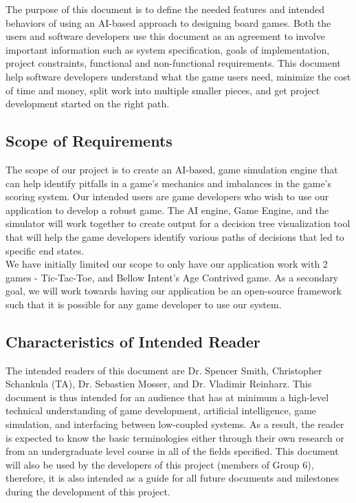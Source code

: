 \documentclass[12pt]{article}
\begin{document}
The purpose of this document is to define the needed features and intended behaviors of using an AI-based approach to designing board games. Both the users and software developers use this document as an agreement to involve important information such as system specification, goals of implementation, project constraints, functional and non-functional requirements. This document help software developers understand what the game users need, minimize the cost of time and money, split work into multiple smaller pieces, and get project development started on the right path.

\subsection{Scope of Requirements} 

The scope of our project is to create an AI-based, game simulation engine that can help identify pitfalls in a game’s mechanics and imbalances in the game’s scoring system. Our intended users are game developers who wish to use our application to develop a robust game. The AI engine, Game Engine, and the simulator will work together to create output for a decision tree visualization tool that will help the game developers identify various paths of decisions that led to specific end states. 
\\We have initially limited our scope to only have our application work with 2 games - Tic-Tac-Toe, and Bellow Intent’s Age Contrived game. As a secondary goal, we will work towards having our application be an open-source framework such that it is possible for any game developer to use our system.


\subsection{Characteristics of Intended Reader} \label{sec_IntendedReader}
The intended readers of this document are Dr. Spencer Smith, Christopher Schankula (TA), Dr. Sebastien Mosser, and Dr. Vladimir Reinharz. This document is thus intended for an audience that has at minimum a high-level technical understanding of game development, artificial intelligence, game simulation, and interfacing between low-coupled systems. As a result, the reader is expected to know the basic terminologies either through their own research or from an undergraduate level course in all of the fields specified. This document will also be used by the developers of this project (members of Group 6), therefore, it is also intended as a guide for all future documents and milestones during the development of this project.
\newpage
\end{document}
